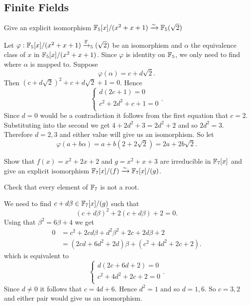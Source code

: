 \subsection{Finite Fields}
\begin{ex}{22.6}
    Give an explicit isomorphism $\mathbb{F}_5[x]/(x^2+x+1)\xrightarrow\sim \mathbb{F}_5(\sqrt{2})$
\end{ex}
\begin{sol}
    Let $\varphi:\mathbb{F}_5[x]/(x^2+x+1)\xrightarrow {\mathbb{F}}_5(\sqrt{2})$ be an isomorphism and $\alpha$ the equivalence class of $x$ in $\mathbb{F}_5[x]/(x^2+x+1)$. 
    Since $\varphi$ is identity on $\mathbb{F}_5$, we only need to find where $\alpha$ is mapped to.
    Suppose
    $$\varphi(\alpha)=c+d\sqrt{2}.$$
    Then $\left(c+d\sqrt{2}\right)^2+c+d\sqrt{2}+1=0$. Hence 
    \begin{equation*}
        \begin{cases}
            d(2c+1)=0\\
            c^2+2d^2+c+1=0\\
        \end{cases}.
    \end{equation*}
     Since $d=0$ would be a contradiction it follows from the first equation that $c=2$.
     Substituting into the second we get $4+2d^2+3=2d^2+2$ and so $2d^2=3$. Therefore $d=2,3$ and either value will give us an isomorphism.
     So let
     $$\varphi(a+b\alpha)=a+b(2+2\sqrt{2})= 2a+2b\sqrt{2}.$$
\end{sol}

\begin{ex}{22.7}
    Show that $f(x)=x^2+2x+2$ and $g=x^2+x+3$ are irreducible in $\mathbb{F}_7[x]$ and give an explicit isomorphism
    $\mathbb{F}_7[x]/(f)\xrightarrow{\sim}\mathbb{F}_7[x]/(g)$.
\end{ex}
\begin{sol}
    Check that every element of $\mathbb{F}_7$ is not a root.

    We need to find $c+d\beta\in\mathbb{F}_7[x]/(g)$ such that
    $$(c+d\beta)^2+2(c+d\beta)+2=0.$$
    Using that $\beta^2=6\beta+4$ we get
    \begin{align*}
        0 &= c^2+2cd\beta+d^2\beta^2+2c+2d\beta+2\\
        &=(2cd+6d^2+2d)\beta+(c^2+4d^2+2c+2).
    \end{align*}
    which is equivalent to
    $$\begin{cases}
        d(2c+6d+2)=0\\
        c^2+4d^2+2c+2=0\\
    \end{cases}.$$
    Since $d\neq0$ it follows that $c=4d+6$. Hence $d^2=1$ and so $d=1,6$.
    So $c=3,2$ and either pair would give us an isomorphism. 
\end{sol}

